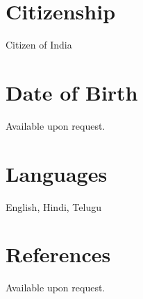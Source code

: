 \documentclass[11pt,margin,line]{res}
\begin{document}
\begin{resume}
\section{\sc Citizenship}
Citizen of India

\section{\sc Date of Birth}
Available upon request.

\section{\sc Languages}
English, Hindi, Telugu

\section{\sc References}
Available upon request.



\end{resume}
\end{document}
